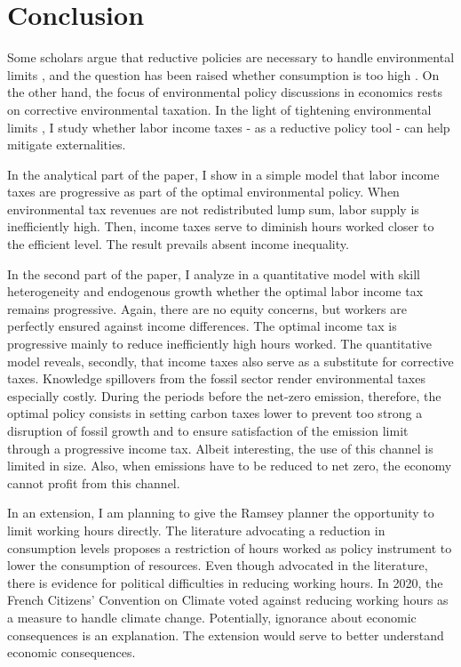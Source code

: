 \section{Conclusion}\label{sec:con}
Some scholars argue that  reductive policies are necessary to handle environmental limits \citep{Schor2005SustainableReductionb, VanVuuren2018AlternativeTechnologies, Bertram2018TargetedScenarios}, and the question has been raised whether consumption is too high \citep{Arrow2004AreMuch}. On the other hand, the focus of environmental policy discussions in economics rests on corrective environmental taxation. In the light of tightening environmental limits \citep{Rockstrom2009AHumanity, IPCC2022}, I study whether labor income taxes - as a reductive policy tool - can help mitigate externalities. 

In the analytical part of the paper, I show in a simple model that labor income taxes are  progressive as part of the optimal environmental policy. %
When environmental tax revenues are not redistributed lump sum, labor supply is inefficiently high. Then, income taxes serve to diminish hours worked closer to the efficient level. The result prevails absent income inequality.


In the second part of the paper, I analyze in a quantitative model with skill heterogeneity and endogenous growth whether the optimal labor income tax remains progressive. Again, there are no equity concerns, but workers are perfectly ensured against income differences. 
The optimal income tax is progressive mainly to reduce inefficiently high hours worked. The quantitative model reveals, secondly, that income taxes also serve as a substitute for corrective taxes. Knowledge spillovers from the fossil sector render environmental taxes especially costly. 
During the periods before the net-zero emission, therefore, the optimal policy consists in setting carbon taxes lower to prevent too strong a disruption of fossil growth and to ensure satisfaction of the emission limit through a progressive income tax. Albeit interesting, the use of this channel is limited in size. Also, when emissions have to be reduced to net zero, the economy cannot profit from this channel. 

In an extension, I am planning to give the Ramsey planner the opportunity to limit working hours directly. The literature advocating a reduction in consumption levels \citep[e.g.,][]{Schor2005SustainableReductionb} proposes a restriction of hours worked as policy instrument to lower the consumption of resources.
Even though advocated in the literature, there is evidence for political difficulties in reducing working hours. In 2020, the French Citizens' Convention on Climate voted against reducing working hours as a measure to handle climate change. Potentially, ignorance about economic consequences is an explanation. The extension would serve to better understand economic consequences. 

